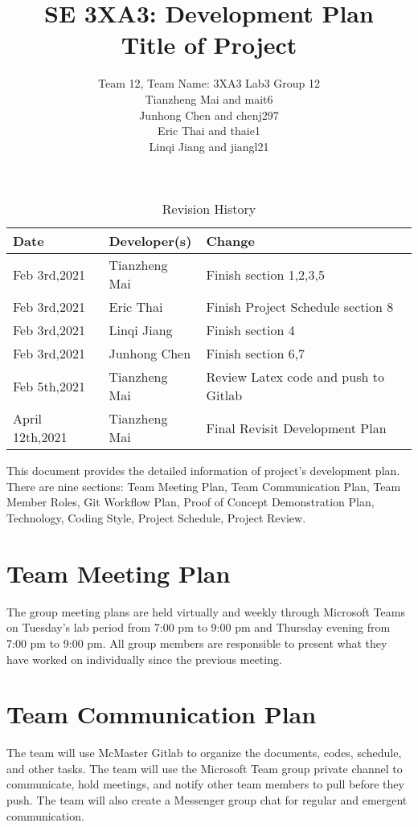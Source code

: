 \documentclass{article}
\title{SE 3XA3: Development Plan\\Title of Project}
\author{Team 12, Team Name: 3XA3 Lab3 Group 12
		\\ Tianzheng Mai and mait6
		\\ Junhong Chen and chenj297
		\\ Eric Thai and thaie1
		\\ Linqi Jiang and jiangl21
}
\date{}
\begin{document}
\begin{table}[hp]
\caption{Revision History} \label{TblRevisionHistory}
\begin{tabularx}{\textwidth}{llX}
\toprule
\textbf{Date} & \textbf{Developer(s)} & \textbf{Change}\\
\midrule
Feb 3rd,2021 & Tianzheng Mai & Finish section 1,2,3,5\\
Feb 3rd,2021 & Eric Thai & Finish Project Schedule section 8\\
Feb 3rd,2021 & Linqi Jiang & Finish section 4\\
Feb 3rd,2021 & Junhong Chen & Finish section 6,7\\
Feb 5th,2021 & Tianzheng Mai & Review Latex code and push to Gitlab\\
April 12th,2021 & Tianzheng Mai & Final Revisit Development Plan\\
\bottomrule
\end{tabularx}
\end{table}

\newpage

\maketitle

This document provides the detailed information of project's development plan. There are nine sections: Team Meeting Plan, Team Communication Plan, Team Member Roles, Git Workflow Plan, Proof of Concept Demonstration Plan, Technology, Coding Style, Project Schedule, Project Review. 

\section{Team Meeting Plan}
The group meeting plans are held virtually and weekly through Microsoft Teams on Tuesday’s lab period from 7:00 pm to 9:00 pm and Thursday evening from 7:00 pm to 9:00 pm. All group members are responsible to present what they have worked on individually since the previous meeting. 
\section{Team Communication Plan}
The team will use McMaster Gitlab to organize the documents, codes, schedule, and other tasks. The team will use the Microsoft Team group private channel to communicate, hold meetings, and notify other team members to pull before they push. The team will also create a Messenger group chat for regular and emergent communication. 
\end{document}
